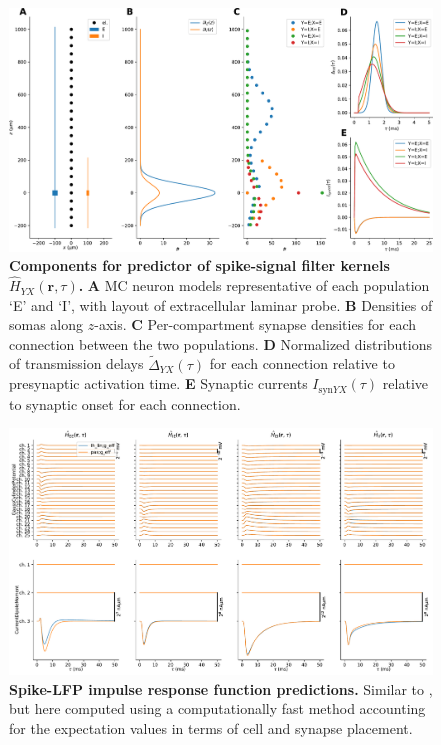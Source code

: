 \begin{figure}[!ht]
\begin{center}
\includegraphics[width=\textwidth]{Figures/Ch-LFPy/Ch-LFPy-ratepredictor.pdf}
\end{center}
\caption{\textbf{Components for predictor of spike-signal filter kernels $\hat{H}_{YX}(\mathbf{r}, \tau)$.}
{\bf A} MC neuron models representative of each population `E' and `I',
with layout of extracellular laminar probe.
{\bf B} Densities of somas along $z$-axis.
{\bf C} Per-compartment synapse densities for each connection between the two populations.
{\bf D} Normalized distributions of transmission delays $\widetilde{\Delta}_{YX} (\tau)$ for each connection relative to presynaptic activation time.
{\bf E} Synaptic currents $I_{\text{syn}YX}(\tau)$ relative to synaptic onset for each connection.
}
\label{fig:LFPy_kernel_predictor}
\end{figure}




\begin{figure}[!ht]
\begin{center}
\includegraphics[width=\textwidth]{Figures/Ch-LFPy/Ch-LFPy-kernel_approx.pdf}
\end{center}
\caption{\textbf{Spike-LFP impulse response function predictions.}
Similar to ,
but here computed using a computationally fast  method accounting for the expectation values in terms of cell and synapse placement.
}
\label{fig:LFPy_kernel_predictions}
\end{figure}



